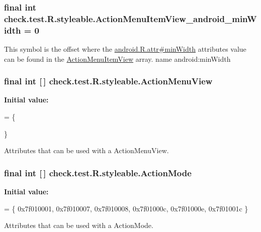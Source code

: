\subsubsection[{Action\+Menu\+Item\+View\+\_\+android\+\_\+min\+Width}]{\setlength{\rightskip}{0pt plus 5cm}final int check.\+test.\+R.\+styleable.\+Action\+Menu\+Item\+View\+\_\+android\+\_\+min\+Width = 0\hspace{0.3cm}{\ttfamily [static]}}\label{classcheck_1_1test_1_1_r_1_1styleable_a87c981bf978b7f6f0732aa8d94620c0e}
This symbol is the offset where the \hyperlink{}{android.\+R.\+attr\#min\+Width} attribute\textquotesingle{}s value can be found in the \hyperlink{classcheck_1_1test_1_1_r_1_1styleable_af9bcde1ea657ba5e365b9244857ff747}{Action\+Menu\+Item\+View} array.  name android\+:min\+Width \hypertarget{classcheck_1_1test_1_1_r_1_1styleable_ace11af9ebf7e91da67085b7da4b26f4e}{}
\subsubsection[{Action\+Menu\+View}]{\setlength{\rightskip}{0pt plus 5cm}final int \mbox{[}$\,$\mbox{]} check.\+test.\+R.\+styleable.\+Action\+Menu\+View\hspace{0.3cm}{\ttfamily [static]}}\label{classcheck_1_1test_1_1_r_1_1styleable_ace11af9ebf7e91da67085b7da4b26f4e}
{\bfseries Initial value\+:}
\begin{DoxyCode}
= \{
            
        \}
\end{DoxyCode}
Attributes that can be used with a Action\+Menu\+View. \hypertarget{classcheck_1_1test_1_1_r_1_1styleable_a06d2fd2de1e471a432f3e49eea7b8015}{}
\subsubsection[{Action\+Mode}]{\setlength{\rightskip}{0pt plus 5cm}final int \mbox{[}$\,$\mbox{]} check.\+test.\+R.\+styleable.\+Action\+Mode\hspace{0.3cm}{\ttfamily [static]}}\label{classcheck_1_1test_1_1_r_1_1styleable_a06d2fd2de1e471a432f3e49eea7b8015}
{\bfseries Initial value\+:}
\begin{DoxyCode}
= \{
            0x7f010001, 0x7f010007, 0x7f010008, 0x7f01000c,
            0x7f01000e, 0x7f01001c
        \}
\end{DoxyCode}
Attributes that can be used with a Action\+Mode. 

